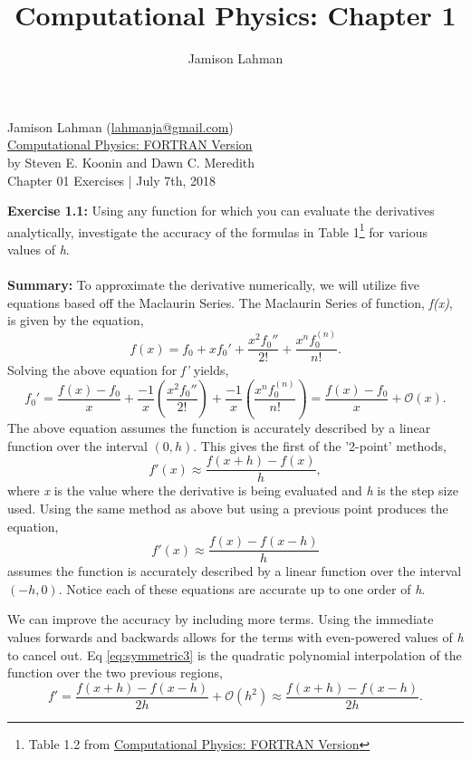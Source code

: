 \documentclass[10pt]{article}
\author{Jamison Lahman}
\title{Computational Physics: Chapter 1}
\begin{document}
\begin{flushright}Jamison Lahman (\href{mailto:lahmanja@gmail.com}{lahmanja@gmail.com}) \\
\href{https://www.amazon.com/Computational-Physics-Fortran-Steven-Koonin/dp/0201386232}{Computational Physics: FORTRAN Version} \\
by Steven E. Koonin and Dawn C. Meredith\\
Chapter 01 Exercises | July 7th, 2018 \\
\end{flushright}
\textbf{Exercise 1.1:} Using any function for which you can evaluate the derivatives analytically, investigate the accuracy of the formulas in Table 1\footnote{Table 1.2 from \href{https://www.amazon.com/Computational-Physics-Fortran-Steven-Koonin/dp/0201386232}{Computational Physics: FORTRAN Version}} for various values of \textit{h}. \\
\\
\textbf{Summary:} To approximate the derivative numerically, we will utilize five equations based off the Maclaurin Series. The Maclaurin Series of function, \textit{f(x)}, is given by the equation,
\begin{equation}
f(x) = f_0 +x f_0'+ \frac{x^2f_0''}{2!} + \frac{x^nf_0^(n)}{n!}.
\end{equation}
Solving the above equation for \textit{f'} yields,
\begin{equation}
f_0' = \frac{f(x)-f_0}{x}+\frac{-1}{x}\left(\frac{x^2f_0''}{2!} \right)+ \frac{-1}{x} \left(\frac{x^nf_0^{(n)}}{n!}\right) =  \frac{f(x)-f_0}{x}  + \mathcal{O}(x).
\end{equation}
The above equation assumes the function is accurately described by a linear function over the interval $(0,h)$. This gives the first of the '2-point' methods, 
\begin{equation}
\label{eq:forward2}
f'(x) \approx \frac{f(x+h)-f(x)}{h},
\end{equation}
where \textit{x} is the value where the derivative is being evaluated and \textit{h} is the step size used. Using the same method as above but using a previous point produces the equation,
\begin{equation}
\label{eq:backward2}
f'(x) \approx \frac{f(x)-f(x-h)}{h}
\end{equation}
assumes the function is accurately described by a linear function over the interval $(-h,0)$. Notice each of these equations are accurate up to one order of \textit{h}. 

We can improve the accuracy by including more terms. Using the immediate values forwards and backwards allows for the terms with even-powered values of \textit{h} to cancel out. Eq \ref{eq:symmetric3} is the quadratic polynomial interpolation of the function over the two previous regions,
\begin{equation}
\label{eq:symmetric3}
f'=\frac{f(x+h)-f(x-h)}{2h} + \mathcal{O}(h^2) \approx \frac{f(x+h)-f(x-h)}{2h}.
\end{equation} 
\end{document}
